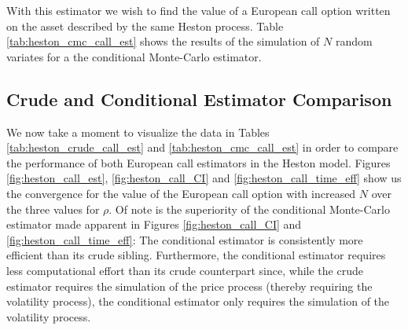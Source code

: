 \documentclass[12pt]{article}
\newlength\tindent
\renewcommand{\indent}{\hspace*{\tindent}}
\begin{document}
\indent With this estimator we wish to find the value of a European call option written on the asset described by the same Heston process. Table \ref{tab:heston_cmc_call_est} shows the results of the simulation of $N$ random variates for a the conditional Monte-Carlo estimator.

{\footnotesize
{}
}

\subsection{{\normalfont Crude and Conditional Estimator Comparison}}

\indent We now take a moment to visualize the data in Tables \ref{tab:heston_crude_call_est} and \ref{tab:heston_cmc_call_est} in order to compare the performance of both European call estimators in the Heston model. Figures \ref{fig:heston_call_est}, \ref{fig:heston_call_CI} and \ref{fig:heston_call_time_eff} show us the convergence for the value of the European call option with increased $N$ over the three values for $\rho$. Of note is the superiority of the conditional Monte-Carlo estimator made apparent in Figures \ref{fig:heston_call_CI} and \ref{fig:heston_call_time_eff}: The conditional estimator is consistently more efficient than its crude sibling. Furthermore, the conditional estimator requires less computational effort than its crude counterpart since, while the crude estimator requires the simulation of the price process (thereby requiring the volatility process), the conditional estimator only requires the simulation of the volatility process.
\end{document}
